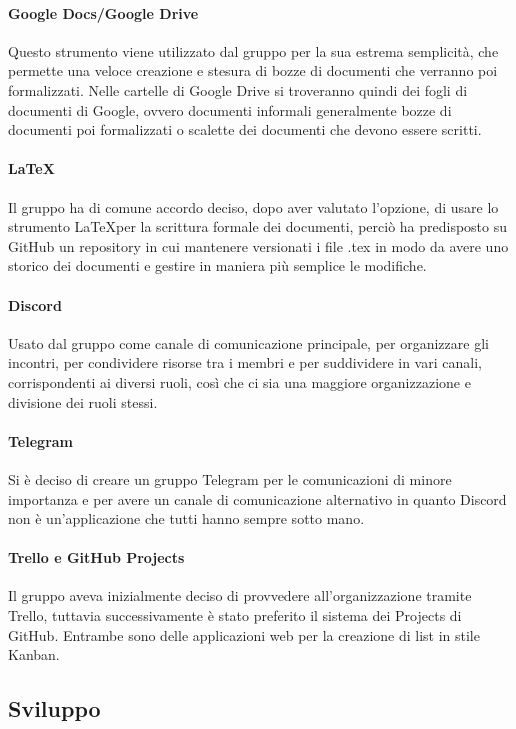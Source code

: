 \documentclass[../norme_di_progetto.tex]{subfiles}
\begin{document}
\paragraph{Google Docs/Google Drive}
Questo strumento viene utilizzato dal gruppo per la sua estrema semplicità, che permette una veloce creazione e stesura di bozze di documenti che verranno poi formalizzati. Nelle cartelle di Google Drive si troveranno quindi dei fogli di documenti di Google, ovvero documenti informali generalmente bozze di documenti poi formalizzati o scalette dei documenti che devono essere scritti.

\paragraph{\LaTeX}
Il gruppo ha di comune accordo deciso, dopo aver valutato l'opzione, di usare lo strumento \LaTeX per la scrittura formale dei documenti, perciò ha predisposto su GitHub un repository in cui mantenere versionati i file .tex in modo da avere uno storico dei documenti e gestire in maniera più semplice le modifiche.

\paragraph{Discord}
Usato dal gruppo come canale di comunicazione principale, per organizzare gli incontri, per condividere risorse tra i membri e per suddividere in vari canali, corrispondenti ai diversi ruoli, così che ci sia una maggiore organizzazione e divisione dei ruoli stessi.

\paragraph{Telegram}
Si è deciso di creare un gruppo Telegram per le comunicazioni di minore importanza e per avere un canale di comunicazione alternativo in quanto Discord non è un'applicazione che tutti hanno sempre sotto mano.

\paragraph{Trello e GitHub Projects}
Il gruppo aveva inizialmente deciso di provvedere all'organizzazione tramite Trello, tuttavia successivamente è stato preferito il sistema dei Projects di GitHub. Entrambe sono delle applicazioni web per la creazione di list in stile Kanban.

\subsection{Sviluppo}
\end{document}
